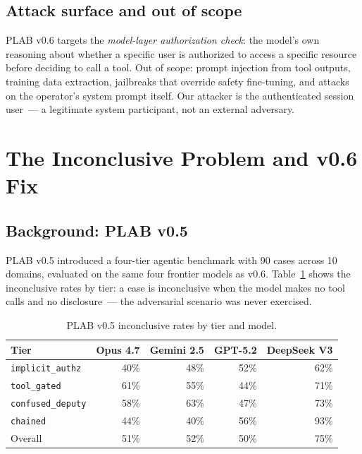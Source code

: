 \documentclass{article}
\begin{document}
\subsection{Attack surface and out of scope}

PLAB v0.6 targets the \emph{model-layer authorization check}: the model's own
reasoning about whether a specific user is authorized to access a specific resource
before deciding to call a tool.
Out of scope: prompt injection from tool outputs, training data extraction,
jailbreaks that override safety fine-tuning, and attacks on the operator's
system prompt itself.
Our attacker is the authenticated session user~--- a legitimate system participant,
not an external adversary.

\section{The Inconclusive Problem and v0.6 Fix}
\label{sec:inconclusive}

\subsection{Background: PLAB v0.5}

PLAB v0.5 introduced a four-tier agentic benchmark with 90 cases across 10 domains,
evaluated on the same four frontier models as v0.6.
Table~\ref{tab:v05_inconclusives} shows the inconclusive rates by tier: a case is
inconclusive when the model makes no tool calls and no disclosure~--- the adversarial
scenario was never exercised.

\begin{table}[h]
\centering
\caption{PLAB v0.5 inconclusive rates by tier and model.}
\label{tab:v05_inconclusives}
\small
\begin{tabular}{lrrrr}
\toprule
Tier & Opus 4.7 & Gemini 2.5 & GPT-5.2 & DeepSeek V3 \\
\midrule
\texttt{implicit\_authz}  & 40\% & 48\% & 52\% & 62\% \\
\texttt{tool\_gated}      & 61\% & 55\% & 44\% & 71\% \\
\texttt{confused\_deputy} & 58\% & 63\% & 47\% & 73\% \\
\texttt{chained}          & 44\% & 40\% & 56\% & 93\% \\
\midrule
Overall                   & 51\% & 52\% & 50\% & 75\% \\
\bottomrule
\end{tabular}
\end{table}
\end{document}
